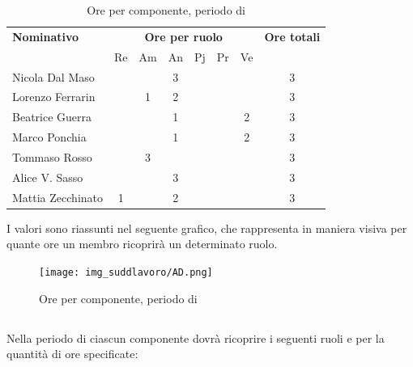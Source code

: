 \begin{table}[H]
	\centering
	\begin{tabular}{|l|c|c|c|c|c|c|c|}
		\hline
		\textbf{Nominativo} & 
		\multicolumn{6}{c|}{\textbf{Ore per ruolo}} & 
		\textbf{Ore totali} \\
		& Re & Am & An & Pj & Pr & Ve & \\
		\hline
		Nicola Dal Maso & & & 3 & & &  & 3 \\
		Lorenzo Ferrarin & & 1 & 2 & & &  & 3 \\
		Beatrice Guerra & & & 1 & & & 2 & 3 \\
		Marco Ponchia & & & 1 & & & 2 & 3 \\
		Tommaso Rosso & & 3 & & & & & 3 \\
		Alice V. Sasso & & & 3 & & & & 3 \\
		Mattia Zecchinato & 1 & & 2 & & & & 3 \\
		\hline
	\end{tabular}
	\caption{Ore per componente, periodo di \AD}
\end{table}
I valori sono riassunti nel seguente grafico, che rappresenta in maniera visiva per quante ore un membro ricoprirà un determinato ruolo.
\begin{figure}[H]
	\centering
	\texttt{[image: img\_suddlavoro/AD.png]}
	\caption{Ore per componente, periodo di \AD{}}
\end{figure}

\subsection{\PA}
Nella periodo di \PA{} ciascun componente dovrà ricoprire i seguenti ruoli e per la quantità di ore specificate:

